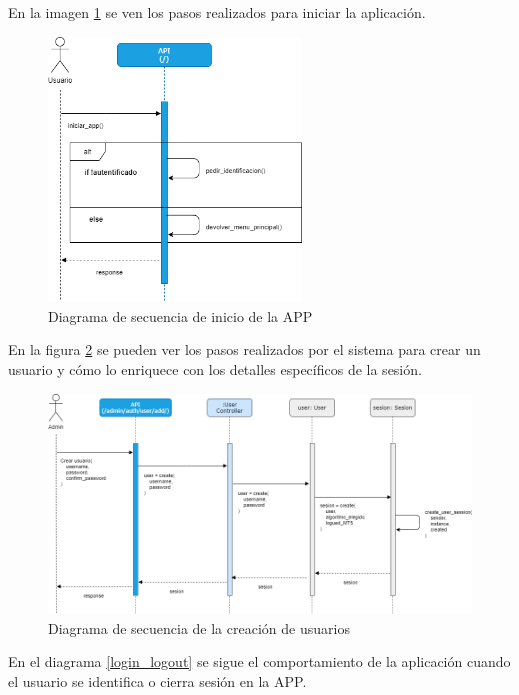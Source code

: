 En la imagen \ref{iniciar_app} se ven los pasos realizados para iniciar la aplicación. \newline

\begin{figure}[h] 
	\includegraphics[width=0.6\textwidth]{imagenes/diagramas_secuencia/iniciar_app.png}
	\caption{Diagrama de secuencia de inicio de la APP} \label{iniciar_app}
\end{figure}

En la figura \ref{secuencia_crear_usuario} se pueden ver los pasos realizados por el sistema para crear un usuario y cómo lo enriquece con los detalles específicos de la sesión. \newline

\begin{figure}[h] 
	\includegraphics[width=1.2\textwidth]{imagenes/diagramas_secuencia/gestion_usuarios.png}
	\caption{Diagrama de secuencia de la creación de usuarios} \label{secuencia_crear_usuario}
\end{figure}

En el diagrama \ref{login_logout} se sigue el comportamiento de la aplicación cuando el usuario se identifica o cierra sesión en la APP. \newline

